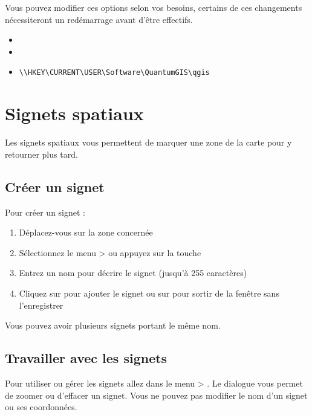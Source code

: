 Vous pouvez modifier ces options selon vos besoins, certains de ces changements nécessiteront un redémarrage avant d'être effectifs.

\begin{itemize}[label=--]
\item {}
\item {}
\item {}
\begin{verbatim}
\\HKEY\CURRENT\USER\Software\QuantumGIS\qgis
\end{verbatim}
\end{itemize}

\section{Signets spatiaux}\label{sec:bookmarks}

Les signets spatiaux vous permettent de marquer une zone de la carte pour y retourner plus tard.

\subsection{Créer un signet}
Pour créer un signet :
\begin{enumerate}
\item Déplacez-vous sur la zone concernée
\item Sélectionnez le menu  >  ou appuyez sur la touche 
\item Entrez un nom pour décrire le signet (jusqu'à 255 caractères)
\item Cliquez sur  pour ajouter le signet ou sur  pour sortir de la fenêtre sans l'enregistrer
\end{enumerate}

Vous pouvez avoir plusieurs signets portant le même nom.

\subsection{Travailler avec les signets}
Pour utiliser ou gérer les signets allez dans le menu  > .
Le dialogue  vous permet de zoomer ou d'effacer un signet.
Vous ne pouvez pas modifier le nom d'un signet ou ses coordonnées.

